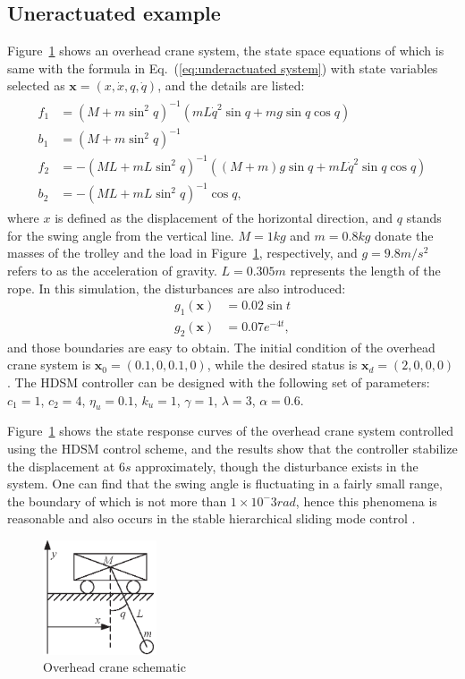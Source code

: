 \documentclass[3p]{elsarticle}
\theoremstyle{plain}
\theoremstyle{remark}
\begin{document}
\subsection{Uneractuated example}
Figure~\ref{Figure:8} shows an overhead crane system, the state space equations of which is same with the formula in Eq.~(\ref{eq:underactuated system}) with state variables selected as $\bm x=(x,\dot x,q,\dot q)$, and the details are listed:
\begin{align}
\begin{split}
f_1&=(M+m\sin^2q)^{-1}(mL\dot q^2\sin q+mg\sin q\cos q)\\
b_1&=(M+m\sin^2q)^{-1}\\
f_2&=-(ML+mL\sin^2q)^{-1}((M+m)g\sin q+mL\dot q^2\sin q\cos q)\\
b_2&=-(ML+mL\sin^2q)^{-1}\cos q,
\end{split}
\end{align}
where $x$ is defined as the displacement of the horizontal direction, and $q$ stands for the swing angle from the vertical line. $M=1kg$ and $m=0.8kg$ donate the masses of the trolley and the load in Figure~\ref{Figure:8}, respectively, and $g=9.8m/s^2$ refers to as the acceleration of gravity. $L=0.305m$ represents the length of the rope. In this simulation, the disturbances are also introduced:
\begin{align}
g_1(\bm x)&= 0.02\sin t\\
g_2(\bm x)&=0.07e^{-4t},
\end{align}
and those boundaries are easy to obtain. The initial condition of the overhead crane system is $\bm x_0 = (0.1,0,0.1,0)$, while the desired status is $\bm x_d = (2,0,0,0)$. The HDSM controller can be designed with the following set of parameters:
$c_1=1$, $c_2=4$, $\eta_u = 0.1$, $k_u=1$, $\gamma = 1$, $\lambda = 3$, $\alpha = 0.6$.\par
Figure~\ref{Figure:8} shows the state response curves of the overhead crane system controlled using the HDSM control scheme, and the results show that the controller stabilize the displacement at $6s$ approximately, though the disturbance exists in the system. One can find that the swing angle is fluctuating in a fairly small range, the boundary of which is not more than $1\times 10^-3rad$, hence this phenomena is reasonable and also occurs in the stable hierarchical sliding mode control \cite{wang2004design}.
\begin{figure}
\centering
\includegraphics[width=0.3\textwidth]{paper3_fig8.eps}
\caption{Overhead crane schematic}
\label{Figure:8}
\end{figure}
\end{document}
